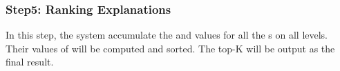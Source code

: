

\subsubsection{Step5: Ranking Explanations}
\label{sec:extending_hi}
In this step, the system accumulate the {\intensity} and {\influecne} values for all the {\explanation}s on all levels. Their values of {\newvalue} will be computed and sorted. The top-K {\explanation} will be output as the final result. 

